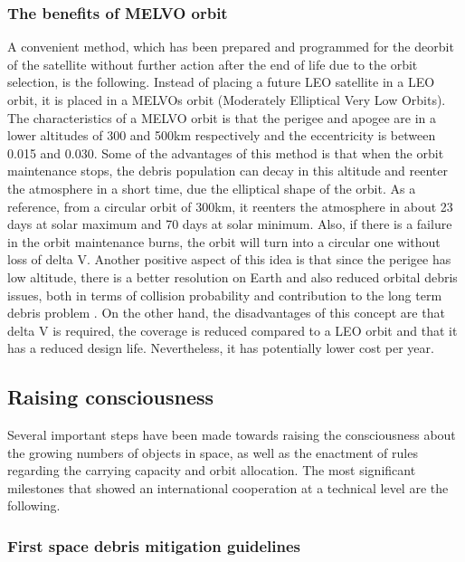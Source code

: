 \subsubsection{The benefits of MELVO orbit}
A convenient method, which has been prepared and programmed for the deorbit of the satellite without further action after the end of life due to the orbit selection, is the following. Instead of placing a future LEO satellite in a LEO orbit, it is placed in a MELVOs orbit (Moderately Elliptical Very Low Orbits). The characteristics of a MELVO orbit is that the perigee and apogee are in a lower altitudes of 300 and 500km respectively and the eccentricity is between 0.015 and 0.030. Some of the advantages of this method is that when the orbit maintenance stops, the debris population can decay in this altitude and reenter the atmosphere in a short time, due the elliptical shape of the orbit. As a reference, from a circular orbit of 300km, it reenters the atmosphere in about 23 days at solar maximum and 70 days at solar minimum. Also, if there is a failure in the orbit maintenance burns, the orbit will turn into a circular one without loss of delta V. Another positive aspect of this idea is that since the perigee has low altitude, there is a better resolution on Earth and also reduced orbital debris issues, both in terms of collision probability and contribution to the long term debris problem \cite{Kramer 2002}. On the other hand, the disadvantages of this concept are that delta V is required, the coverage is reduced compared to a LEO orbit and that it has a reduced design life. Nevertheless, it has potentially lower cost per year.



\bigskip
\subsection{Raising consciousness}
\bigskip

Several important steps have been made towards raising the consciousness about the growing numbers of objects in space, as well as the enactment of rules regarding the carrying capacity and orbit allocation. The most significant milestones that showed an international cooperation at a technical level are the following.

\bigskip
\subsubsection{First space debris mitigation guidelines}
\bigskip

